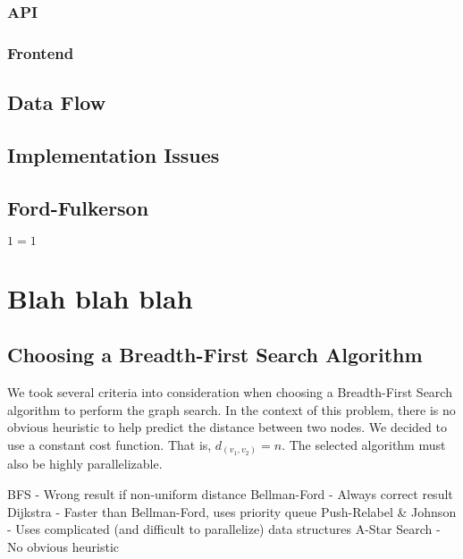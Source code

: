 \documentclass[12pt,letterpaper,oneside,draft]{report}
\theoremstyle{definition}
\begin{document}
				\subsection{API}
				\subsection{Frontend}

			\section{Data Flow}
			
			\section{Implementation Issues}

		\section{Ford-Fulkerson}
			\begin{algorithm}
				\begin{algorithmic}
					\ENSURE $1=1$
				\end{algorithmic}
			\end{algorithm}

	
	\chapter{Blah blah blah}
		\section{Choosing a Breadth-First Search Algorithm}
			We took several criteria into consideration when choosing a Breadth-First Search algorithm to perform the graph search.  In the context of this problem, there is no obvious heuristic to help predict the distance between two nodes.  We decided to use a constant cost function.  That is, $d_{(v_1, v_2)} = n$.  The selected algorithm must also be highly parallelizable.

			

			BFS - Wrong result if non-uniform distance
			Bellman-Ford - Always correct result
			Dijkstra - Faster than Bellman-Ford, uses priority queue
			Push-Relabel \& Johnson - Uses complicated (and difficult to parallelize) data structures
			A-Star Search - No obvious heuristic
	
	
\end{document}
